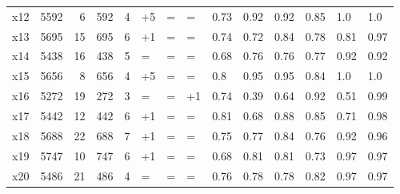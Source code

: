 \begin{tabular}{lrrrllllllllll}
x12 & 5592 & 6 & 592 & 4 & +5 & = & = & 0.73 & 0.92 & 0.92 & 0.85 & 1.0 & 1.0 \\
x13 & 5695 & 15 & 695 & 6 & +1 & = & = & 0.74 & 0.72 & 0.84 & 0.78 & 0.81 & 0.97 \\
x14 & 5438 & 16 & 438 & 5 & = & = & = & 0.68 & 0.76 & 0.76 & 0.77 & 0.92 & 0.92 \\
x15 & 5656 & 8 & 656 & 4 & +5 & = & = & 0.8 & 0.95 & 0.95 & 0.84 & 1.0 & 1.0 \\
x16 & 5272 & 19 & 272 & 3 & = & = & +1 & 0.74 & 0.39 & 0.64 & 0.92 & 0.51 & 0.99 \\
x17 & 5442 & 12 & 442 & 6 & +1 & = & = & 0.81 & 0.68 & 0.88 & 0.85 & 0.71 & 0.98 \\
x18 & 5688 & 22 & 688 & 7 & +1 & = & = & 0.75 & 0.77 & 0.84 & 0.76 & 0.92 & 0.96 \\
x19 & 5747 & 10 & 747 & 6 & +1 & = & = & 0.68 & 0.81 & 0.81 & 0.73 & 0.97 & 0.97 \\
x20 & 5486 & 21 & 486 & 4 & = & = & = & 0.76 & 0.78 & 0.78 & 0.82 & 0.97 & 0.97 \\
\bottomrule
\end{tabular}
